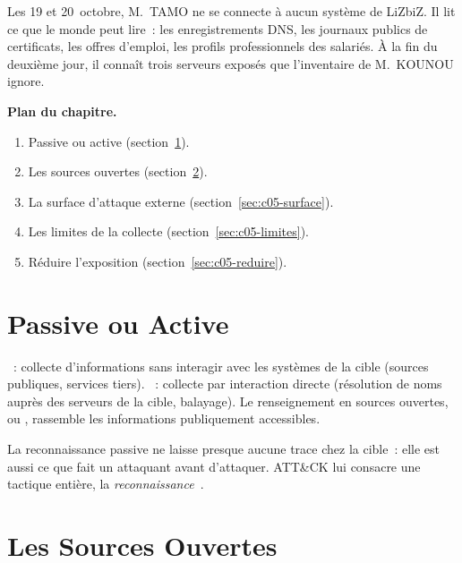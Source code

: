 Les 19 et 20~octobre, M.~TAMO ne se connecte à aucun système de LiZbiZ. Il
lit ce que le monde peut lire~: les enregistrements DNS, les journaux
publics de certificats, les offres d'emploi, les profils professionnels des
salariés. À la fin du deuxième jour, il connaît trois serveurs exposés que
l'inventaire de M.~KOUNOU ignore.

\medskip
\textbf{Plan du chapitre.}
\begin{enumerate}
    \item Passive ou active (section~\ref{sec:c05-passive}).
    \item Les sources ouvertes (section~\ref{sec:c05-sources}).
    \item La surface d'attaque externe (section~\ref{sec:c05-surface}).
    \item Les limites de la collecte (section~\ref{sec:c05-limites}).
    \item Réduire l'exposition (section~\ref{sec:c05-reduire}).
\end{enumerate}

\separateur

\section{Passive ou Active}
\label{sec:c05-passive}

\begin{boxdef}
~: collecte d'informations sans interagir
avec les systèmes de la cible (sources publiques, services tiers).
~: collecte par interaction directe
(résolution de noms auprès des serveurs de la cible, balayage). Le
renseignement en sources ouvertes, ou , rassemble les
informations publiquement accessibles.
\end{boxdef}

La reconnaissance passive ne laisse presque aucune trace chez la cible~:
elle est aussi ce que fait un attaquant avant d'attaquer. ATT\&CK lui
consacre une tactique entière, la \emph{reconnaissance}~\cite{mitreattack}.

\section{Les Sources Ouvertes}
\label{sec:c05-sources}

